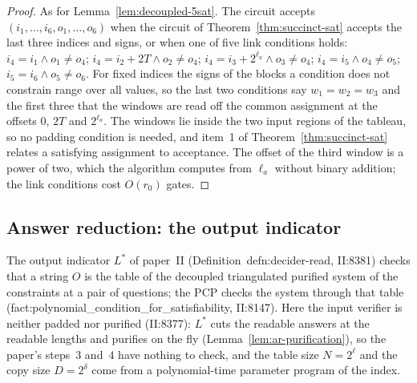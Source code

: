 \begin{proof}
\leanok
As for Lemma~\ref{lem:decoupled-5sat}. The circuit accepts $(i_1, \dots, i_6, o_1, \dots, o_6)$
when the circuit of Theorem~\ref{thm:succinct-sat} accepts the last three indices and signs, or
when one of five link conditions holds: $i_4 = i_1 \land o_1 \neq o_4$; \;
$i_4 = i_2 + 2T \land o_2 \neq o_4$; \; $i_4 = i_3 + 2^{\ell_a} \land o_3 \neq o_4$; \;
$i_4 = i_5 \land o_4 \neq o_5$; \; $i_5 = i_6 \land o_5 \neq o_6$. For fixed indices the signs of
the blocks a condition does not constrain range over all values, so the last two conditions say
$w_1 = w_2 = w_3$ and the first three that the windows are read off the common assignment at the
offsets $0$, $2T$ and $2^{\ell_a}$. The windows lie inside the two input regions of the tableau,
so no padding condition is needed, and item~1 of Theorem~\ref{thm:succinct-sat} relates a
satisfying assignment to acceptance. The offset of the third window is a power of two, which the
algorithm computes from $\ell_a$ without binary addition; the link conditions cost $O(r_0)$
gates.
\end{proof}

\subsection{Answer reduction: the output indicator}

The output indicator $L^*$ of paper~II (Definition~defn:decider-read, II:8381) checks that a string
$O$ is the table of the decoupled triangulated purified system of the constraints at a pair of
questions; the PCP checks the system through that table
(fact:polynomial\_condition\_for\_satisfiability, II:8147). Here the input verifier is neither
padded nor purified (II:8377): $L^*$ cuts the readable answers at the readable lengths and
purifies on the fly (Lemma~\ref{lem:ar-purification}), so the paper's steps~3 and~4 have nothing
to check, and the table size $N = 2^\ell$ and the copy size $D = 2^{\delta}$ come from a
polynomial-time parameter program of the index.

